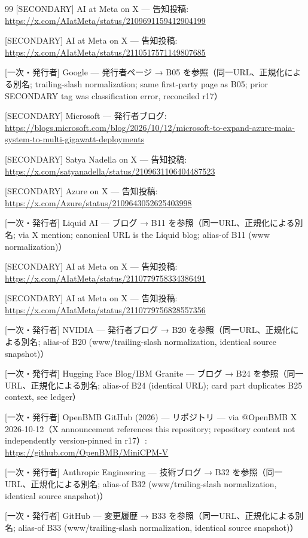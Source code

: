 \documentclass[lualatex,a4paper,10pt]{jlreq}
\begin{document}
\begin{thebibliography}{99}
 [SECONDARY] AI at Meta on X — 告知投稿: \url{https://x.com/AIatMeta/status/2109691159412904199}

 [SECONDARY] AI at Meta on X — 告知投稿: \url{https://x.com/AIatMeta/status/2110517571149807685}

 [一次・発行者] Google — 発行者ページ → B05 を参照（同一URL、正規化による別名; trailing-slash normalization; same first-party page as B05; prior SECONDARY tag was classification error, reconciled r17）

 [SECONDARY] Microsoft — 発行者ブログ: \url{https://blogs.microsoft.com/blog/2026/10/12/microsoft-to-expand-azure-maia-system-to-multi-gigawatt-deployments}

 [SECONDARY] Satya Nadella on X — 告知投稿: \url{https://x.com/satyanadella/status/2109631106404487523}

 [SECONDARY] Azure on X — 告知投稿: \url{https://x.com/Azure/status/2109643052625403998}

 [一次・発行者] Liquid AI — ブログ → B11 を参照（同一URL、正規化による別名; via X mention; canonical URL is the Liquid blog; alias-of B11 (www normalization)）

 [SECONDARY] AI at Meta on X — 告知投稿: \url{https://x.com/AIatMeta/status/2110779758334386491}

 [SECONDARY] AI at Meta on X — 告知投稿: \url{https://x.com/AIatMeta/status/2110779756828557356}

 [一次・発行者] NVIDIA — 発行者ブログ → B20 を参照（同一URL、正規化による別名; alias-of B20 (www/trailing-slash normalization, identical source snapshot)）

 [一次・発行者] Hugging Face Blog/IBM Granite — ブログ → B24 を参照（同一URL、正規化による別名; alias-of B24 (identical URL); card part duplicates B25 context, see ledger）

 [一次・発行者] OpenBMB GitHub (2026) — リポジトリ — via @OpenBMB X 2026-10-12（X announcement references this repository; repository content not independently version-pinned in r17）: \url{https://github.com/OpenBMB/MiniCPM-V}

 [一次・発行者] Anthropic Engineering — 技術ブログ → B32 を参照（同一URL、正規化による別名; alias-of B32 (www/trailing-slash normalization, identical source snapshot)）

 [一次・発行者] GitHub — 変更履歴 → B33 を参照（同一URL、正規化による別名; alias-of B33 (www/trailing-slash normalization, identical source snapshot)）


\end{thebibliography}
\end{document}
